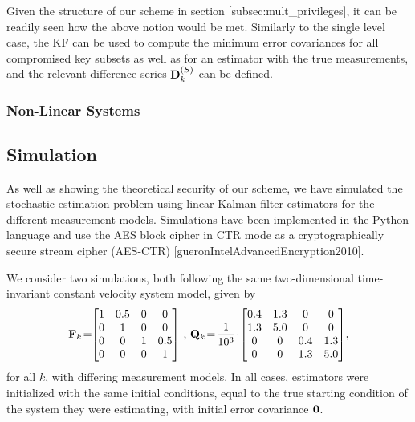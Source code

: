 Given the structure of our scheme in section [subsec:mult\_privileges], it can be readily seen how the above notion would be met. Similarly to the single level case, the KF can be used to compute the minimum error covariances for all compromised key subsets as well as for an estimator with the true measurements, and the relevant difference series ${{\mathbf{D}}}^{(S)}_k$ can be defined. 

% 
% 

\subsubsection{Non-Linear Systems}

% 
% 
\subsection{Simulation}\label{subsec:priv_estimation:est_simulation}
As well as showing the theoretical security of our scheme, we have simulated the stochastic estimation problem using linear Kalman filter estimators for the different measurement models. Simulations have been implemented in the Python language and use the AES block cipher in CTR mode as a cryptographically secure stream cipher (AES-CTR) [gueronIntelAdvancedEncryption2010].

We consider two simulations, both following the same two-dimensional time-invariant constant velocity system model, given by
\begin{equation*}
   \mat{F}_k\! = \!\!
   \begin{bmatrix}
      1 & 0.5 & 0 & 0\\
      0 & 1 & 0 & 0\\
      0 & 0 & 1 & 0.5\\
      0 & 0 & 0 & 1
   \end{bmatrix}\,,\,
   \mat{Q}_k\! = \!\frac{1}{10^3}\!\cdot\!
   \begin{bmatrix}
      0.4 & 1.3 & 0 & 0\\
      1.3 & 5.0 & 0 & 0\\
      0 & 0 & 0.4 & 1.3\\
      0 & 0 & 1.3 & 5.0
   \end{bmatrix}\!,
\end{equation*}
for all $k$, with differing measurement models. In all cases, estimators were initialized with the same initial conditions, equal to the true starting condition of the system they were estimating, with initial error covariance ${{\mathbf{0}}}$.

